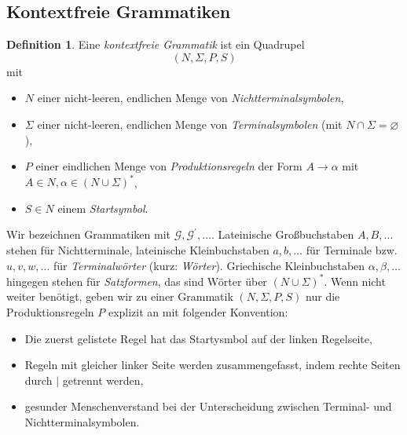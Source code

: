 \documentclass[11pt, a4paper]{article}
\theoremstyle{definition}
\newtheorem{definition}{Definition}[section]
\theoremstyle{plain}
\numberwithin{equation}{section}
\let\emptyset\varnothing
\begin{document}
\subsection{Kontextfreie Grammatiken}
\begin{definition}
	Eine \textit{kontextfreie Grammatik} ist ein Quadrupel
	$$
		(N, \Sigma, P, S)
	$$
	mit
	\begin{itemize}
		\item $N$ einer nicht-leeren, endlichen Menge von \textit{Nichtterminalsymbolen},
		\item $\Sigma$ einer nicht-leeren, endlichen Menge von \textit{Terminalsymbolen} (mit $N \cap \Sigma = \emptyset$),
		\item $P$ einer eindlichen Menge von \textit{Produktionsregeln} der Form $A \to \alpha$ mit $A \in N, \alpha \in (N \cup \Sigma)^\ast$,
		\item $S \in N$ einem \textit{Startsymbol}.
	\end{itemize}
\end{definition}
Wir bezeichnen Grammatiken mit $\mathcal{G}, \mathcal{G}^\prime, \ldots$. Lateinische Großbuchstaben $A, B, \ldots$ stehen für Nichtterminale, lateinische Kleinbuchstaben $a, b, \ldots$ für Terminale bzw. $u, v, w, \ldots$ für \textit{Terminalwörter} (kurz: \textit{Wörter}). Griechische Kleinbuchstaben $\alpha, \beta, \ldots$ hingegen stehen für \textit{Satzformen}, das sind Wörter über $(N \cup \Sigma)^\ast$. Wenn nicht weiter benötigt, geben wir zu einer Grammatik $(N, \Sigma, P, S)$ nur die Produktionsregeln $P$ explizit an mit folgender Konvention:
\begin{itemize}
	\item Die zuerst gelistete Regel hat das Startysmbol auf der linken Regelseite,
	\item Regeln mit gleicher linker Seite werden zusammengefasst, indem rechte Seiten durch $|$ getrennt werden,
	\item gesunder Menschenverstand bei der Unterscheidung zwischen Terminal- und Nichtterminalsymbolen.
\end{itemize}
\end{document}
